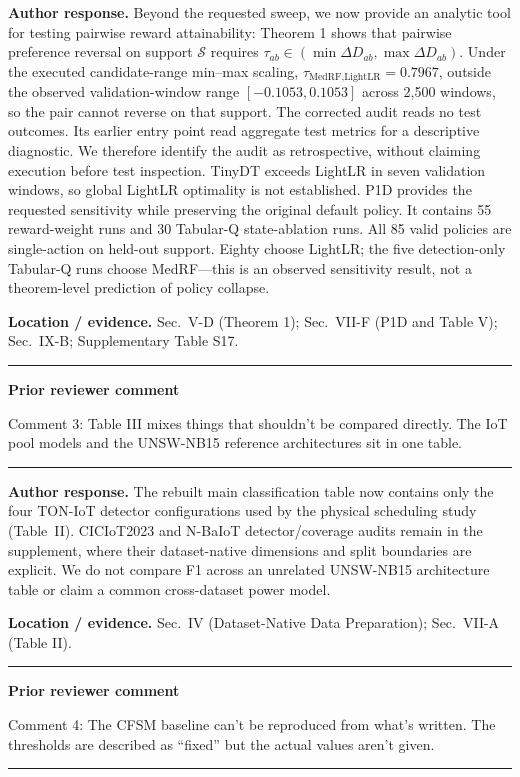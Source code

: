 \documentclass[11pt]{article}
\newenvironment{qbox}
    {\par\vspace{4pt}\noindent\begin{minipage}{\linewidth}\rule{\linewidth}{0.4pt}\par\noindent\textbf{Prior reviewer comment}\par\noindent}
    {\par\rule{\linewidth}{0.4pt}\end{minipage}\par\vspace{4pt}}
\begin{document}
\textbf{Author response.} Beyond the requested sweep, we now provide an analytic tool for testing pairwise reward attainability: Theorem 1 shows that pairwise preference reversal on support $\mathcal S$ requires $\tau_{ab}\in(\min\Delta D_{ab},\max\Delta D_{ab})$. Under the executed candidate-range min--max scaling, $\tau_{\text{MedRF,LightLR}}=0.7967$, outside the observed validation-window range $[-0.1053,0.1053]$ across 2{,}500 windows, so the pair cannot reverse on that support. The corrected audit reads no test outcomes. Its earlier entry point read aggregate test metrics for a descriptive diagnostic. We therefore identify the audit as retrospective, without claiming execution before test inspection. TinyDT exceeds LightLR in seven validation windows, so global LightLR optimality is not established. P1D provides the requested sensitivity while preserving the original default policy. It contains 55 reward-weight runs and 30 Tabular-Q state-ablation runs. All 85 valid policies are single-action on held-out support. Eighty choose LightLR; the five detection-only Tabular-Q runs choose MedRF---this is an observed sensitivity result, not a theorem-level prediction of policy collapse.

\textbf{Location / evidence.} Sec.~V-D (Theorem 1); Sec.~VII-F (P1D and Table V); Sec.~IX-B; Supplementary Table S17.

\begin{qbox}
Comment 3: Table III mixes things that shouldn't be compared directly. The IoT pool models and the UNSW-NB15 reference architectures sit in one table.
\end{qbox}

\textbf{Author response.} The rebuilt main classification table now contains only the four TON-IoT detector configurations used by the physical scheduling study (Table~II). CICIoT2023 and N-BaIoT detector/coverage audits remain in the supplement, where their dataset-native dimensions and split boundaries are explicit. We do not compare F1 across an unrelated UNSW-NB15 architecture table or claim a common cross-dataset power model.

\textbf{Location / evidence.} Sec.~IV (Dataset-Native Data Preparation); Sec.~VII-A (Table II).

\begin{qbox}
Comment 4: The CFSM baseline can't be reproduced from what's written. The thresholds are described as ``fixed'' but the actual values aren't given.
\end{qbox}
\end{document}
